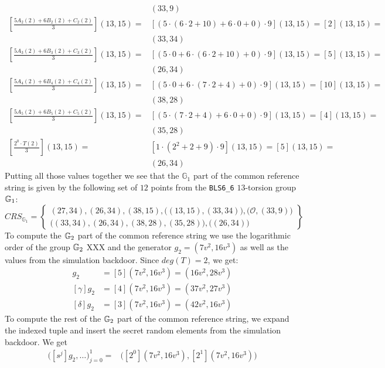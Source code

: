 \begin{example}
\begin{align*}
 & (33,9) \\
[\frac{5 A_{2}(2)+ 6 B_{2}(2) + C_{2}(2)}{3}](13,15) =
 & [(5\cdot (6\cdot 2 +10) +6\cdot 0 +0 )\cdot 9](13,15) = [2](13,15) = \\
 & (33,34) \\
[\frac{5 A_{3}(2)+ 6 B_{3}(2) + C_{3}(2)}{3}](13,15) =
 & [(5\cdot 0 +6\cdot (6\cdot 2 + 10) + 0 )\cdot 9](13,15) = [5](13,15) = \\
 & (26,34) \\
[\frac{5 A_{4}(2)+ 6 B_{4}(2) + C_{4}(2)}{3}](13,15) = 
 & [(5\cdot 0+6\cdot(7\cdot 2 +4)+0)\cdot 9](13,15) =[10](13,15) = \\
 & (38,28) \\
[\frac{5 A_{5}(2)+ 6 B_{5}(2) + C_{5}(2)}{3}](13,15) =
 & [(5\cdot (7\cdot 2 + 4) +6\cdot 0 + 0 )\cdot 9](13,15) = [4](13,15) = \\
 & (35,28)\\
[\frac{2^0\cdot T(2)}{3}](13,15) =
 & [1\cdot (2^2+2+9)\cdot 9](13,15)= [5](13,15) = \\
 & (26,34)
\end{align*}
Putting all those values together we see that the $\mathbb{G}_1$ part of the common reference string is given by the following set of $12$ points from the \texttt{BLS6\_6} $13$-torsion group $\mathbb{G}_1$: 
$$
CRS_{\mathbb{G}_{1}}=\left\{ \begin{array}{c}
(27,34),(26,34),(38,15),\Big((13,15),(33,34)\Big),
\Big(\mathcal{O}, (33,9)\Big)\\
\Big((33,34),(26,34),(38,28),(35,28)\Big),
\Big((26,34)\Big)
\end{array}\right\}
$$
To compute the $\mathbb{G}_2$ part of the common reference string we use the logarithmic order of the group $\mathbb{G}_2$ XXX and the generator $g_2=(7v^2,16v^3)$ as well as the values from the simulation backdoor. Since $deg(T)=2$, we get:
\begin{align*}
[\beta]g_2 & = [5](7v^2,16v^3) = (16v^2,28v^3) \\
[\gamma]g_2 & = [4](7v^2,16v^3) = (37v^2,27v^3) \\
[\delta]g_2 & = [3](7v^2,16v^3) = (42v^2,16v^3)
\end{align*}
To compute the rest of the $\mathbb{G}_2$ part of the common reference string, we expand the indexed tuple and insert the secret random elements from the simulation backdoor. We get
\begin{align*}
\Big( [s^{j}]g_2,\ldots\Big) _{j=0}^{1} = 
 & \Big( [2^0](7v^2,16v^3), [2^1](7v^2,16v^3)\Big)  \\

\end{align*}
\end{example}
